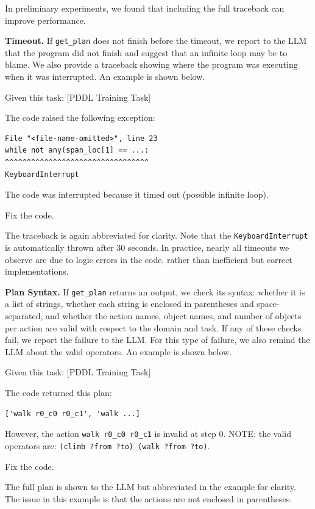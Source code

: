 \documentclass[letterpaper]{article} %
\begin{document}
In preliminary experiments, we found that including the full traceback can improve performance.

\textbf{Timeout.} If \texttt{get\_plan} does not finish before the timeout, we report to the LLM that the program did not finish and suggest that an infinite loop may be to blame.
We also provide a traceback showing where the program was executing when it was interrupted.
An example is shown below.

\begin{tcolorbox}[left=2pt,right=2pt]
Given this task: [PDDL Training Task]

The code raised the following exception:
\begin{verbatim}
File "<file-name-omitted>", line 23
while not any(span_loc[1] == ...:
^^^^^^^^^^^^^^^^^^^^^^^^^^^^^^^^^
KeyboardInterrupt
\end{verbatim}
The code was interrupted because it timed out (possible infinite loop).

Fix the code.
\end{tcolorbox}

The traceback is again abbreviated for clarity.
Note that the \texttt{KeyboardInterrupt} is automatically thrown after 30 seconds.
In practice, nearly all timeouts we observe are due to logic errors in the code, rather than inefficient but correct implementations.

\textbf{Plan Syntax.} If \texttt{get\_plan} returns an output, we check its syntax: whether it is a list of strings, whether each string is enclosed in parentheses and space-separated, and whether the action names, object names, and number of objects per action are valid with respect to the domain and task.
If any of these checks fail, we report the failure to the LLM.
For this type of failure, we also remind the LLM about the valid operators.
An example is shown below.

\begin{tcolorbox}[left=2pt,right=2pt]
Given this task: [PDDL Training Task]

The code returned this plan:
\begin{verbatim}
['walk r0_c0 r0_c1', 'walk ...]
\end{verbatim}
However, the action \texttt{walk r0\_c0 r0\_c1} is invalid at step 0. NOTE: the valid operators are: \texttt{(climb ?from ?to) (walk ?from ?to)}.

Fix the code.
\end{tcolorbox}

The full plan is shown to the LLM but abbreviated in the example for clarity.
The issue in this example is that the actions are not enclosed in parentheses.
\end{document}
